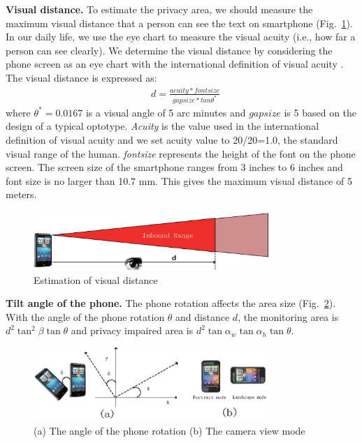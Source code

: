 \textbf{Visual distance.} To estimate the privacy area, we should measure the maximum visual distance that a person can see the text on smartphone (Fig.~\ref{fig:distance}). In our daily life, we use the eye chart to measure the visual acuity (i.e., how far  a person can see clearly). We determine the visual distance by considering the phone screen as an eye chart with the international definition of visual acuity \cite{acuity}.  The visual distance is expressed as:
\begin{equation}
\begin{split}
& d=\frac{acuity*font size}{gap size*tan\theta^*}
\end{split}
\end{equation}
where $\theta^*=0.0167$ is a visual angle of 5 arc minutes and $gapsize$ is 5 based on the design of a typical optotype. \textit{Acuity} is the value used in the international definition of visual acuity and we set acuity value to 20/20=1.0, the standard visual range of the human.  \textit{fontsize} represents the height of the font on the phone screen. The screen size of the smartphone  ranges from 3 inches to 6 inches and font size is no larger than 10.7 mm. This gives the maximum visual distance of 5 meters.
\begin{figure}[H]
\centering
\includegraphics[width=3.5in]{distance.eps}
\caption{Estimation of  visual distance}
\label{fig:distance}
\end{figure}


\textbf{Tilt angle of the phone.}
The phone rotation affects the area size (Fig.~\ref{fig:rotation}).  With the angle of the phone rotation $\theta$ and distance $d$, the monitoring area is  $d^2\tan^2\beta\tan\theta$ and  privacy impaired area is $d^2\tan\alpha_w\tan\alpha_h\tan\theta$.
\begin{figure}[H]
\centering
\includegraphics[width=3.5in]{rotation.eps}
\caption{(a) The angle of the phone rotation (b) The camera view mode}
\label{fig:rotation}
\end{figure}

